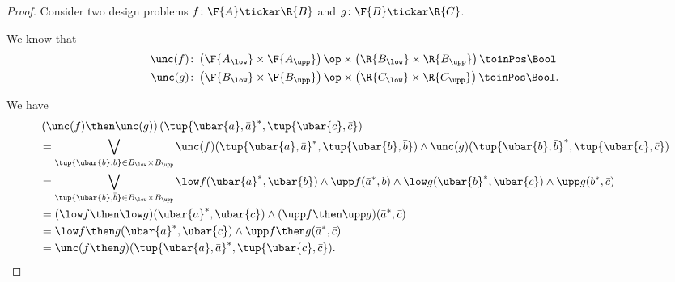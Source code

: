\begin{proof}
Consider two design problems $f\colon \F{A}\tickar \R{B}$ and $g\colon \F{B}\tickar \R{C}$.

We know that
\begin{equation}
    \begin{aligned}
    \unc(f)&\colon \left( \F{A_{\low}}\times \F{A_{\upp}}\right)\op \times \left( \R{B_{\low}}\times \R{B_{\upp}}\right)\toinPos \Bool\\
    \unc(g)&\colon \left( \F{B_{\low}}\times \F{B_{\upp}}\right)\op \times \left( \R{C_{\low}}\times \R{C_{\upp}}\right)\toinPos \Bool.
    \end{aligned}
\end{equation}

We have
\begin{equation}
    \begin{aligned}
    &\left(\unc(f)\then \unc(g)\right) (\tup{\ubar{a},\bar{a}}^*,\tup{\ubar{c},\bar{c}})\\
    &=\bigvee_{\tup{\ubar{b},\bar{b}}\in B_{\low}\times B_{\upp}} \unc(f)(\tup{\ubar{a},\bar{a}}^*,\tup{\ubar{b},\bar{b}})\wedge \unc(g)(\tup{\ubar{b},\bar{b}}^*,\tup{\ubar{c},\bar{c}})\\
    &= \bigvee_{\tup{\ubar{b},\bar{b}}\in B_{\low}\times B_{\upp}} \low f(\ubar{a}^*,\ubar{b})\wedge \upp f(\bar{a}^*,\bar{b})\wedge \low g(\ubar{b}^*,\ubar{c})\wedge \upp g(\bar{b}^*,\bar{c})\\
    &=(\low f\then \low g)(\ubar{a}^*,\ubar{c})\wedge (\upp f\then \upp g)(\bar{a}^*,\bar{c})\\
    &=\low f\then g (\ubar{a}^*,\ubar{c})\wedge \upp f\then g(\bar{a}^*,\bar{c})\\
    &=\unc(f\then g)(\tup{\ubar{a},\bar{a}}^*,\tup{\ubar{c},\bar{c}}).
    \end{aligned}
\end{equation}
\end{proof}


